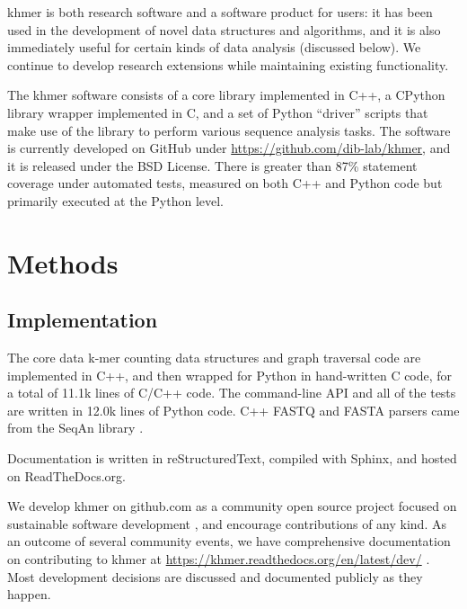 \documentclass[10pt,a4paper]{article}
\begin{document}
khmer is both research software and a software product for users: it
has been used in the development of novel data structures and
algorithms, and it is also immediately useful for certain kinds of
data analysis (discussed below).  We continue to develop research
extensions while maintaining existing functionality.

The khmer software consists of a core library implemented in C++, a
CPython library wrapper implemented in C, and a set of Python
``driver'' scripts that make use of the library to perform various
sequence analysis tasks.  The software is currently developed on
GitHub under \url{https://github.com/dib-lab/khmer}, and it is released under the BSD
License.  There is greater than 87\% statement coverage under
automated tests, measured on both C++ and Python code but primarily
executed at the Python level.

\section*{Methods}


\subsection*{Implementation}

The core data k-mer counting data structures and graph traversal code are implemented in C++, and
then wrapped for Python in hand-written C code, for a total of
11.1k lines of C/C++ code.  The command-line API and all of the tests
are written in 12.0k lines of Python code. C++ FASTQ and FASTA parsers came from the SeqAn library \cite{SeqAn}.

Documentation is written in reStructuredText, compiled with Sphinx, and hosted on ReadTheDocs.org.

We develop khmer on github.com as a community open source project focused on sustainable
software development \cite{wssspe1}, and encourage
contributions of any kind.  As an outcome of several community events, we have
comprehensive documentation on contributing to khmer at \url{https://khmer.readthedocs.org/en/latest/dev/} \cite{wssspe2}.
Most development decisions are discussed and documented publicly as they happen.
\end{document}
